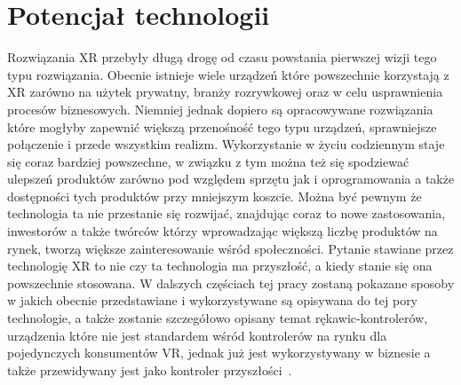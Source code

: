 \section{Potencjał technologii}
\label{sec:potencjal}
Rozwiązania XR przebyły długą drogę od czasu powstania pierwszej wizji tego typu rozwiązania. Obecnie istnieje wiele urządzeń które powszechnie korzystają z XR zarówno na użytek prywatny, branży rozrywkowej oraz w celu usprawnienia procesów biznesowych. Niemniej jednak dopiero są opracowywane rozwiązania które mogłyby zapewnić większą przenośność tego typu urządzeń, sprawniejsze połączenie i przede wszystkim realizm. Wykorzystanie w życiu codziennym staje się coraz bardziej powszechne, w związku z tym można też się  spodziewać ulepszeń produktów zarówno pod względem sprzętu jak i oprogramowania a także dostępności tych produktów przy mniejszym koszcie. Można być pewnym że technologia ta nie przestanie się rozwijać, znajdując coraz to nowe zastosowania, inwestorów a także twórców którzy wprowadzając większą liczbę produktów na rynek, tworzą większe zainteresowanie wśród społeczności. Pytanie stawiane przez technologię XR to nie czy ta technologia ma przyszłość, a kiedy stanie się ona powszechnie stosowana. W dalszych częściach tej pracy zostaną pokazane sposoby w jakich obecnie przedstawiane i wykorzystywane są opisywana do tej pory technologie, a także zostanie szczegółowo opisany temat rękawic-kontrolerów, urządzenia które nie jest standardem wśród kontrolerów na rynku dla pojedynczych konsumentów VR, jednak już jest wykorzystywany w biznesie a także przewidywany jest jako kontroler przyszłości~\cite{terms}.

